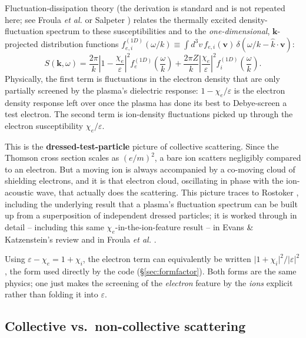 \documentclass[11pt]{article}
\begin{document}
Fluctuation-dissipation theory (the derivation is standard and is not repeated here; see
Froula \textit{et al.} \cite{sheffield2011} or Salpeter \cite{salpeter1960}) relates
the thermally excited density-fluctuation spectrum to
these susceptibilities and to the \emph{one-dimensional}, $\mathbf k$-projected
distribution functions $f_{e,i}^{(1D)}(\omega/k) \equiv \int d^3v\, f_{e,i}(\mathbf
v)\,\delta(\omega/k - \hat k\cdot\mathbf v)$:
\begin{equation}\label{eq:S-general}
  S(\mathbf k,\omega) = \frac{2\pi}{k}\left\vert 1-\frac{\chi_e}{\varepsilon}\right\vert^2
  f_e^{(1D)}\!\left(\frac{\omega}{k}\right)
  + \frac{2\pi Z}{k}\left\vert \frac{\chi_e}{\varepsilon}\right\vert^2
  f_i^{(1D)}\!\left(\frac{\omega}{k}\right).
\end{equation}
Physically, the first term is fluctuations in the electron density that are only partially
screened by the plasma's dielectric response: $1-\chi_e/\varepsilon$ is the electron
density response left over once the plasma has done its best to Debye-screen a test
electron. The second term is ion-density fluctuations picked up through the electron susceptibility
$\chi_e/\varepsilon$.

This is the \textbf{dressed-test-particle} picture of collective scattering. Since the
Thomson cross section scales as $(e/m)^2$, a bare ion scatters negligibly compared to an
electron. But a moving ion is always accompanied by a co-moving cloud of shielding
electrons, and it is that electron cloud, oscillating in phase with the ion-acoustic wave,
that actually does the scattering. This picture traces to Rostoker \cite{rostoker1964},
including the underlying result that a plasma's fluctuation spectrum can be built up from a
superposition of independent dressed particles; it is worked through in detail -- including
this same $\chi_e$-in-the-ion-feature result -- in Evans \& Katzenstein's review
\cite{evans1969} and in Froula \textit{et al.} \cite{sheffield2011}.

Using $\varepsilon-\chi_e = 1+\chi_i$, the electron term can equivalently be written
$\vert 1+\chi_i\vert^2/\vert\varepsilon\vert^2$, the form used directly by the code
(\S\ref{sec:formfactor}). Both forms are the same physics; one just makes the screening of
the \emph{electron} feature by the \emph{ions} explicit rather than folding it into
$\varepsilon$.

\subsection{Collective vs.\ non-collective scattering}
\end{document}
